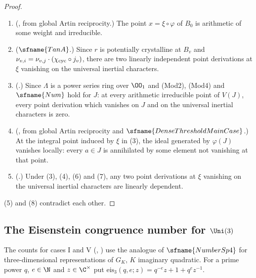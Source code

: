 \begin{proof}
\begin{enumerate}[label=(\arabic*)]
has the same property.
\item (, from global Artin reciprocity.) The point $x=\xi\circ\varphi$ of $B_0$ is
arithmetic of some weight and irreducible.
\item ($\sfname{TanA}$.) Since $r$ is potentially crystalline at $B_v$ and $\nu_{v,i}=\nu_{v,j}\cdot(\chi_{\mathrm{cyc}}\circ
j_v)$, there are two linearly independent point derivations at $\xi$ vanishing on the universal inertial characters.
\item (.) Since $\Lambda$ is a power series ring over $\OO_1$ and
(Mod2), (Mod4) and $\sfname{Num}$ hold for $J$: at every arithmetic irreducible point of $V(J)$, every point derivation which
vanishes on $J$ and on the universal inertial characters is zero.
\item (, from global Artin reciprocity and
$\sfname{DenseThresholdMainCase}$.) At the integral point induced by $\xi$ in (3), the ideal generated by $\varphi(J)$
vanishes locally: every $a\in J$ is annihilated by some element not vanishing at that point.
\item (.) Under (3), (4), (6) and (7), any two point derivations at $\xi$ vanishing on the
universal inertial characters are linearly dependent.
\end{enumerate}
(5) and (8) contradict each other.
\end{proof}

\subsection{The Eisenstein congruence number for \texorpdfstring{$\Uni(3)$}{U(3)}}\label{sec:pf:modularity:numU3}

The counts for cases I and V (,
) use the analogue of
$\sfname{NumberSp4}$ for three-dimensional representations of $G_K$, $K$ imaginary quadratic. For a prime power $q$,
$e\in\N$ and $z\in\C^\times$ put $\mathrm{eis}_3(q,e;z)=q^{-e}z+1+q^ez^{-1}$.


